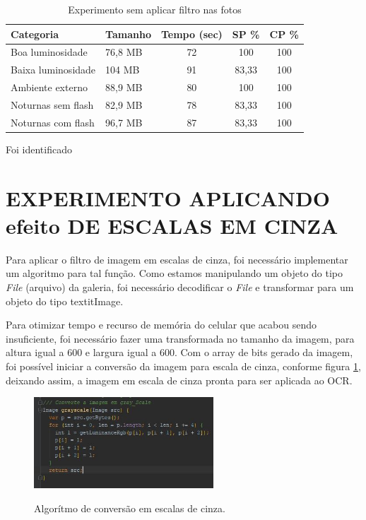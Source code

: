 \begin{table}[]
\caption{Experimento sem aplicar filtro nas fotos}
\label{tab:exp_sem_filtro}
\centering
\begin{tabular}{llccc}
\hline
Categoria          & Tamanho    & Tempo (sec) & SP \%  & CP \% \\ \hline
Boa luminosidade   & 76,8 MB & 72     & 100 & 100         \\
Baixa luminosidade & 104 MB & 91     & 83,33 & 100         \\
Ambiente externo   & 88,9 MB & 80     & 100 & 100         \\
Noturnas sem flash & 82,9 MB & 78     & 83,33& 100         \\
Noturnas com flash & 96,7 MB & 87     & 83,33 & 100         \\ \hline
\end{tabular}
	\label{fig:exp_sem_filtro}
\end{table}

Foi identificado 


\section{EXPERIMENTO APLICANDO efeito DE ESCALAS EM CINZA}
Para aplicar o filtro de imagem em escalas de cinza, foi necessário implementar um algoritmo para tal função. Como estamos manipulando um objeto do tipo \textit{File} (arquivo) da galeria, foi necessário decodificar o \textit{File} e transformar para um objeto do tipo textit{Image}. 

Para otimizar tempo e recurso de memória do celular que acabou sendo insuficiente, foi necessário fazer uma transformada no tamanho da imagem, para altura igual a 600 e largura igual a 600. Com o array de bits gerado da imagem, foi possível iniciar a conversão da imagem para escala de cinza, conforme figura \ref{fig:greyscale}, deixando assim, a imagem em escala de cinza pronta para ser aplicada ao OCR.




 \begin{figure}[h]
	\centering
	\includegraphics[width=0.6\textwidth]{Imagens/greyscale.JPG} %
	\caption[Algorítmo de conversão em escalas de cinza.]{Algorítmo de conversão em escalas de cinza.}
	\label{fig:greyscale}
\end{figure}

